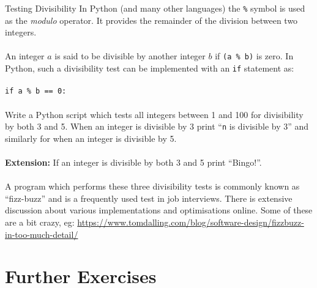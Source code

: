 \documentclass{lab}
\begin{document}
\begin{task}{Testing Divisibility}{}
In Python (and many other languages) the \texttt{\%} symbol is used as the \textit{modulo} operator. It provides the remainder of the division between two integers.
\\~\\
An integer $a$ is said to be divisible by another integer $b$ if \texttt{(a \% b)} is zero. In Python, such a divisibility test can be implemented with an \texttt{if} statement as:
\\~\\
\texttt{if a \% b == 0:}
\\~\\
Write a Python script which tests all integers between 1 and 100 for divisibility by both 3 and 5. When an integer is divisible by 3 print ``\texttt{n} is divisible by 3'' and similarly for when an integer is divisible by 5.
\\~\\
\textbf{Extension:} If an integer is divisible by both 3 and 5 print ``Bingo!''.
\\~\\
A program which performs these three divisibility tests is commonly known as ``fizz-buzz'' and is a frequently used test in job interviews. There is extensive discussion about various implementations and optimisations online. Some of these are a bit crazy, eg: \url{https://www.tomdalling.com/blog/software-design/fizzbuzz-in-too-much-detail/}
\end{task}

\pagebreak

\section{Further Exercises}
\end{document}

